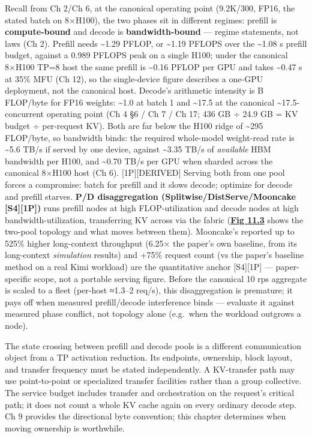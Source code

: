 Recall from Ch 2/Ch 6, at the canonical operating point (9.2K/300, FP16,
the stated batch on 8×H100), the two phases sit in different regimes:
prefill is \textbf{compute-bound} and decode is \textbf{bandwidth-bound}
--- regime statements, not laws (Ch 2). Prefill needs
\textasciitilde1.29 PFLOP, or \textasciitilde1.19 PFLOPS over the
\textasciitilde1.08 s prefill budget, against a 0.989 PFLOPS peak on a
single H100; under the canonical 8×H100 TP=8 host the same prefill is
\textasciitilde0.16 PFLOP per GPU and takes \textasciitilde0.47 s at
35\% MFU (Ch 12), so the single-device figure describes a one-GPU
deployment, not the canonical host. Decode's arithmetic intensity is B
FLOP/byte for FP16 weights: \textasciitilde1.0 at batch 1 and
\textasciitilde17.5 at the canonical \textasciitilde17.5-concurrent
operating point (Ch 4 §6 / Ch 7 / Ch 17; 436 GB ÷ 24.9 GB = KV budget ÷
per-request KV). Both are far below the H100 ridge of \textasciitilde295
FLOP/byte, so bandwidth binds: the required whole-model weight-read rate
is \textasciitilde5.6 TB/s if served by one device, against
\textasciitilde3.35 TB/s of \emph{available} HBM bandwidth per H100, and
\textasciitilde0.70 TB/s per GPU when sharded across the canonical
8×H100 host (Ch 6). \mbox{{[}1P{]}}\hspace{0pt}\mbox{{[}DERIVED{]}} Serving both from one pool
forces a compromise: batch for prefill and it slows decode; optimize for
decode and prefill starves. \textbf{P/D disaggregation
(Splitwise/DistServe/Mooncake \mbox{{[}S4{]}}\hspace{0pt}\mbox{{[}1P{]}})} runs prefill nodes at
high FLOP-utilization and decode nodes at high bandwidth-utilization,
transferring KV across via the fabric (\textbf{\hyperref[fig:11.3]{Fig 11.3}} shows the
two-pool topology and what moves between them). Mooncake's reported up
to 525\% higher long-context throughput (6.25× the paper's own baseline,
from its long-context \emph{simulation} results) and +75\% request count
(vs the paper's baseline method on a real Kimi workload) are the
quantitative anchor \mbox{{[}S4{]}}\hspace{0pt}\mbox{{[}1P{]}} --- paper-specific scope, not a
portable serving figure. Before the canonical 10 rps aggregate is scaled
to a fleet (per-host ≈1.3--2 req/s), this disaggregation is premature;
it pays off when measured prefill/decode interference binds --- evaluate
it against measured phase conflict, not topology alone (e.g.~when the
workload outgrows a node).

The state crossing between prefill and decode pools is a different
communication object from a TP activation reduction. Its endpoints,
ownership, block layout, and transfer frequency must be stated
independently. A KV-transfer path may use point-to-point or specialized
transfer facilities rather than a group collective. The service budget
includes transfer and orchestration on the request's critical path; it
does not count a whole KV cache again on every ordinary decode step. Ch
9 provides the directional byte convention; this chapter determines when
moving ownership is worthwhile.


